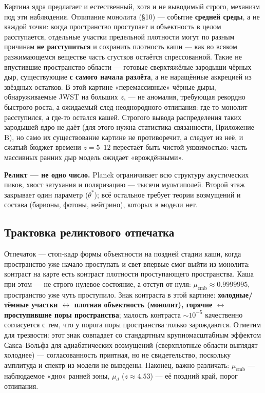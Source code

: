 \documentclass{article}
\begin{document}
Картина ядра предлагает и естественный, хотя и не выводимый строго, механизм под эти наблюдения. Отлипание монолита (\S10) --- событие \textbf{средней среды}, а не каждой точки: когда пространство проступает и объектность в целом расступается, отдельные участки предельной плотности могут по разным причинам \textbf{не расступиться} и сохранить плотность каши --- как во всяком разжимающемся веществе часть сгустков остаётся спрессованной. Такие не впустившие пространство области --- готовые сверхтяжёлые зародыши чёрных дыр, существующие \textbf{с самого начала разлёта}, а не наращённые аккрецией из звёздных остатков. В этой картине «перемассивные» чёрные дыры, обнаруживаемые JWST на больших $z$, --- не аномалия, требующая рекордно быстрого роста, а ожидаемый след неоднородного отлипания: где-то монолит расступился, а где-то остался кашей. Строгого вывода распределения таких зародышей ядро не даёт (для этого нужна статистика связанности, Приложение B), но само их существование картине не противоречит, а следует из неё, и сжатый бюджет времени $z = 5\text{--}12$ перестаёт быть чистой уязвимостью: часть массивных ранних дыр модель ожидает «врождёнными».

\medskip
\noindent\textbf{Реликт --- не одно число.} Planck ограничивает всю структуру акустических пиков, хвост затухания и поляризацию --- тысячи мультиполей. Второй этаж закрывает один параметр ($\theta^*$); всё остальное требует теории возмущений и состава (барионы, фотоны, нейтрино), которых в модели нет.

\subsection{Трактовка реликтового отпечатка}

Отпечаток --- стоп-кадр формы объектности на поздней стадии каши, когда пространство уже начало проступать и свет впервые смог выйти из монолита: контраст на карте есть контраст плотности проступающего пространства. Каша при этом --- не строго нулевое состояние, а отступ от нуля: $\mu_{\text{cmb}} \approx 0.9999995$, пространство уже чуть проступило. Знак контраста в этой картине: \textbf{холодные/тёмные участки $\leftrightarrow$ плотная объектность (монолит), горячие $\leftrightarrow$ проступившие поры пространства}; малость контраста ${\sim}10^{-5}$ качественно согласуется с тем, что у порога поры пространства только зарождаются. Отметим для трезвости: этот знак совпадает со стандартным крупномасштабным эффектом Сакса--Вольфа для адиабатических возмущений (сверхплотные области выглядят холоднее) --- согласованность приятная, но не свидетельство, поскольку амплитуда и спектр из модели не выведены. Наконец, важно различать: $\mu_{\text{cmb}}$ --- наблюдаемое «дно» ранней зоны, $\mu_d$ ($z \approx 4.53$) --- её поздний край, порог отлипания.
\end{document}

